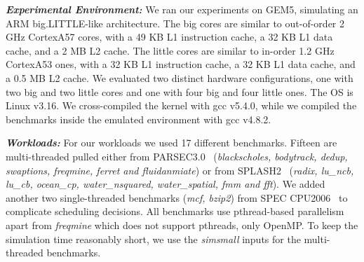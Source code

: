 \begin{table}
{\begin{tabular}{p{1.5cm} |p{5.5cm} || p{1.5cm} |p{9cm} }
    \bottomrule
  \end{tabular}}
\end{table}

\textbf{\textit{Experimental Environment:}} We ran our experiments on GEM5, simulating an ARM big.LITTLE-like architecture. The big cores are similar to out-of-order 2 GHz CortexA57 cores, with a 49 KB L1 instruction cache, a 32 KB L1 data cache, and a 2 MB L2 cache. The little cores are similar to in-order 1.2 GHz CortexA53 ones, with a 32 KB L1 instruction cache, a 32 KB L1 data cache, and a 0.5 MB L2 cache. We evaluated two distinct hardware configurations, one with two big and two little cores and one with four big and four little ones. The OS is Linux v3.16. We cross-compiled the kernel with gcc v5.4.0, while we compiled the benchmarks inside the emulated environment with gcc v4.8.2.

\textbf{\textit{Workloads:}} For our workloads we used 17 different benchmarks. Fifteen are multi-threaded pulled either from PARSEC3.0~\cite{bienia11benchmarking} ({\it blackscholes, bodytrack, dedup, swaptions, freqmine, ferret and fluidanmiate}) or from SPLASH2~\cite{woo1995splash} ({\it radix, lu\_ncb, lu\_cb, ocean\_cp, water\_nsquared, water\_spatial, fmm and fft}). We added another two single-threaded benchmarks ({\it mcf, bzip2}) from SPEC CPU2006~\cite{henning2006spec} to complicate scheduling decisions. All benchmarks use pthread-based parallelism apart from \emph{freqmine} which does not support pthreads, only OpenMP. To keep the simulation time reasonably short, we use the \emph{simsmall} inputs for the multi-threaded benchmarks.

